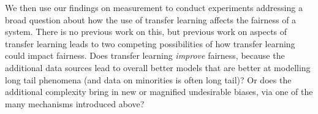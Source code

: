 
We then use our findings on measurement to conduct experiments addressing a broad question about how the use of transfer learning affects the fairness of a system. There is no previous work on this, but previous work on aspects of transfer learning leads to two competing possibilities of how transfer learning could impact fairness. Does transfer learning \textit{improve} fairness, because the additional data sources lead to overall better models that are better at modelling long tail phenomena (and data on minorities is often long tail)? Or does the additional complexity bring in new or magnified undesirable biases, via one of the many mechanisms introduced above? 


